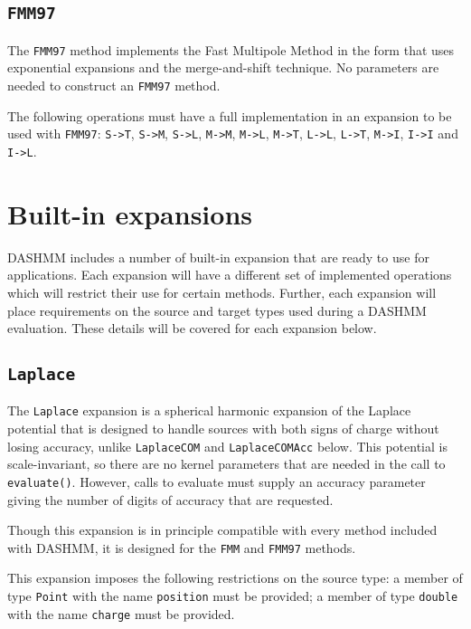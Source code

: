 \subsection{\texttt{FMM97}}

The \texttt{FMM97} method implements the Fast Multipole Method in the form that
uses exponential expansions and the merge-and-shift technique. No parameters
are needed to construct an \texttt{FMM97} method.

The following operations must have a full implementation in an expansion to be
used with \texttt{FMM97}: \texttt{S->T}, \texttt{S->M}, \texttt{S->L},
\texttt{M->M}, \texttt{M->L}, \texttt{M->T}, \texttt{L->L},
\texttt{L->T}, \texttt{M->I}, \texttt{I->I} and \texttt{I->L}.


\section{Built-in expansions}
\label{sec:bi-exp}

DASHMM includes a number of built-in expansion that are ready to use for
applications. Each expansion will have a different set of implemented
operations which will restrict their use for certain methods. Further, each
expansion will place requirements on the source and target types used during
a DASHMM evaluation. These details will be covered for each expansion
below.

\subsection{\texttt{Laplace}}

The \texttt{Laplace} expansion is a spherical harmonic expansion of the Laplace
potential that is designed to handle sources with both signs of charge without
losing accuracy, unlike \texttt{LaplaceCOM} and \texttt{LaplaceCOMAcc} below.
This potential is scale-invariant, so there are no kernel parameters that are
needed in the call to \texttt{evaluate()}. However, calls to evaluate must
supply an accuracy parameter giving the number of digits of accuracy that are
requested.

Though this expansion is in principle compatible with every method included
with DASHMM, it is designed for the \texttt{FMM} and \texttt{FMM97} methods.

This expansion imposes the following restrictions on the source type: a
member of type \texttt{Point} with the name \texttt{position} must be provided;
a member of type \texttt{double} with the name \texttt{charge} must be
provided.

